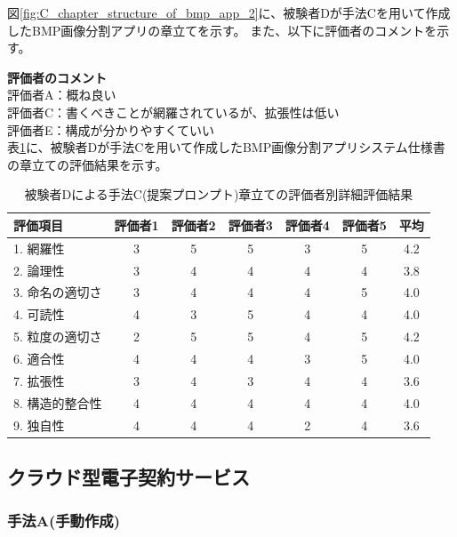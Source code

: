 図\ref{fig:C_chapter_structure_of_bmp_app_2}に、被験者Dが手法Cを用いて作成したBMP画像分割アプリの章立てを示す。
また、以下に評価者のコメントを示す。

\noindent\textbf{評価者のコメント}\\
評価者A：概ね良い\\
評価者C：書くべきことが網羅されているが、拡張性は低い\\
評価者E：構成が分かりやすくていい\\

表\ref{tb:detailed_evaluation_results_C2}に、被験者Dが手法Cを用いて作成したBMP画像分割アプリシステム仕様書の章立ての評価結果を示す。

\begin{table}[tp]
  \caption{被験者Dによる手法C(提案プロンプト)章立ての評価者別詳細評価結果}
  \label{tb:detailed_evaluation_results_C2}
  \centering
  \begin{tabular}{|l|c|c|c|c|c|c|}
    \hline
    \textbf{評価項目} & \textbf{評価者1} & \textbf{評価者2} & \textbf{評価者3} & \textbf{評価者4} & \textbf{評価者5} & \textbf{平均} \\
    \hline\hline
    1. 網羅性 & 3 & 5 & 5 & 3 & 5 & 4.2 \\
    \hline
    2. 論理性 & 3 & 4 & 4 & 4 & 4 & 3.8 \\
    \hline
    3. 命名の適切さ & 3 & 4 & 4 & 4 & 5 & 4.0 \\
    \hline
    4. 可読性 & 4 & 3 & 5 & 4 & 4 & 4.0 \\
    \hline
    5. 粒度の適切さ & 2 & 5 & 5 & 4 & 5 & 4.2 \\
    \hline
    6. 適合性 & 4 & 4 & 4 & 3 & 5 & 4.0 \\
    \hline
    7. 拡張性 & 3 & 4 & 3 & 4 & 4 & 3.6 \\
    \hline
    8. 構造的整合性 & 4 & 4 & 4 & 4 & 4 & 4.0 \\
    \hline
    9. 独自性 & 4 & 4 & 4 & 2 & 4 & 3.6 \\
    \hline
  \end{tabular}
\end{table}




\subsection{クラウド型電子契約サービス}
\subsubsection{手法A(手動作成)}

